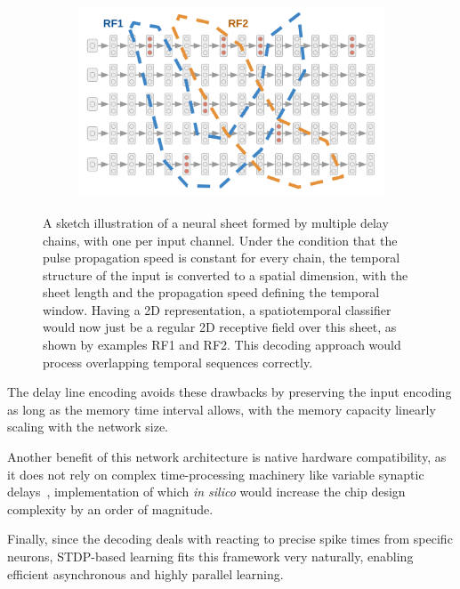 \begin{figure}[h!]
  \centering
  \begin{subfigure}{.9\textwidth}
    \includegraphics[width=\linewidth]{img/chapter3/neural_sheet_sketch.png}
    \caption{}
  \end{subfigure}
    \caption[Neural sheet sketch with receptive fields]{A sketch illustration of a neural sheet formed by multiple delay chains, with one per input channel. Under the condition that the pulse propagation speed is constant for every chain, the temporal structure of the input is converted to a spatial dimension, with the sheet length and the propagation speed defining the temporal window. Having a 2D representation, a spatiotemporal classifier would now just be a regular 2D receptive field over this sheet, as shown by examples RF1 and RF2. This decoding approach would process overlapping temporal sequences correctly.}
  \label{fig:neural_sheet_sketch}
\end{figure}

The delay line encoding avoids these drawbacks by preserving the input encoding as long as the memory time interval allows, with the memory capacity linearly scaling with the network size.

Another benefit of this network architecture is native hardware compatibility, as it does not rely on complex time-processing machinery like variable synaptic delays~\cite{Izhikevich06a}, implementation of which \emph{in silico} would increase the chip design complexity by an order of magnitude.

Finally, since the decoding deals with reacting to precise spike times from specific neurons, \ac{STDP}-based learning fits this framework very naturally, enabling efficient asynchronous and highly parallel learning.

